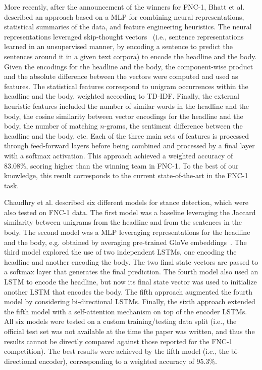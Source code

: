 More recently, after the announcement of the winners for FNC-1, Bhatt et al.~\cite{combination} described an approach based on a MLP for combining neural representations, statistical summaries of the data, and feature engineering heuristics. The neural representations leveraged skip-thought vectors~\cite{skip} (i.e., sentence representations learned in an unsupervised manner, by encoding a sentence to predict the sentences around it in a given text corpora) to encode the headline and the body. Given the encodings for the headline and the body, the component-wise product and the absolute difference between the vectors were computed and used as features. The statistical features correspond to unigram occurrences within the headline and the body, weighted according to TD-IDF. Finally, the external heuristic features included the number of similar words in the headline and the body, the cosine similarity between vector encodings for the  headline and the body, the number of matching $n$-grams, the sentiment difference between the headline and the body, etc. Each of the three main sets of features is processed through feed-forward layers before being combined and processed by a final layer with a softmax activation. This approach achieved a weighted accuracy of 83.08\%, scoring higher than the winning team in FNC-1. To the best of our knowledge, this result corresponds to the current state-of-the-art in the FNC-1 task.

Chaudhry et al. \cite{stanfordstance} described six different models for stance detection, which were also tested on FNC-1 data. The first model was a baseline leveraging the Jaccard similarity between unigrams from the headline and from the sentences in the body. The second model was a MLP leveraging representations for the headline and the body, e.g. obtained by averaging pre-trained GloVe embeddings~\cite{glove}. The third model explored the use of two independent LSTMs, one encoding the headline and another encoding the body. The two final state vectors are passed to a softmax layer that generates the final prediction. The fourth model also used an LSTM to encode the headline, but now its final state vector was used to initialize another LSTM that encodes the body. The fifth approach augmented the fourth model by considering bi-directional LSTMs. Finally, the sixth approach extended the fifth model with a self-attention mechanism on top of the encoder LSTMs. All six models were tested on a custom training/testing data split (i.e., the official test set was not available at the time the paper was written, and thus the results cannot be directly compared against those reported for the FNC-1 competition). The best results were achieved by the fifth model (i.e., the bi-directional encoder), corresponding to a weighted accuracy of 95.3\%.

